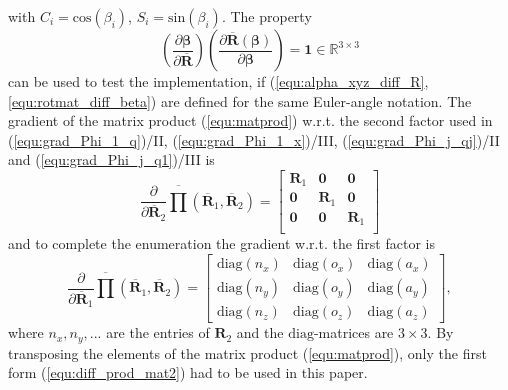 \documentclass[robotics,article,submit,moreauthors,pdftex]{Definitions/mdpi}
\newcommand{\bm}[1]{\boldsymbol{#1}}
\begin{document}
%
with $C_i=\mathrm{cos}(\beta_i)$, $S_i=\mathrm{sin}(\beta_i)$.
The property
%
\begin{equation}
\left(\frac{\partial \bm{\beta}}{\partial \overline{\bm{R}}}\right)
\left(\frac{\partial \overline{\bm{R}}(\bm{\beta})}{\partial \bm{\beta}}\right)
=
\bm{1} \in {\mathbb{R}}^{3 \times 3}
\end{equation}
%
can be used to test the implementation, if (\ref{equ:alpha_xyz_diff_R}, \ref{equ:rotmat_diff_beta}) are defined for the same Euler-angle notation.
The gradient of the matrix product (\ref{equ:matprod}) w.r.t. the second factor used in (\ref{equ:grad_Phi_1_q})/II, (\ref{equ:grad_Phi_1_x})/III, (\ref{equ:grad_Phi_j_qj})/II and (\ref{equ:grad_Phi_j_q1})/III is
%
\begin{equation}
\frac{\partial }{\partial \overline{\bm{R}}_2}
\overline{\prod}\left( \overline{\bm{R}}_1, \overline{\bm{R}}_2\right)
=
\begin{bmatrix}
\bm{R}_1 & \bm{0} & \bm{0} \\
\bm{0} & \bm{R}_1 & \bm{0} \\
\bm{0} & \bm{0} & \bm{R}_1  \\
\end{bmatrix}
\label{equ:diff_prod_mat2}
\end{equation}
%
and to complete the enumeration the gradient w.r.t. the first factor is
%
\begin{equation}
\frac{\partial }{\partial \overline{\bm{R}}_1}
\overline{\prod}\left( \overline{\bm{R}}_1, \overline{\bm{R}}_2\right)
=
\begin{bmatrix}
{\mathrm{diag}}(n_x)&{\mathrm{diag}}(o_x)&{\mathrm{diag}}(a_x) \\ {\mathrm{diag}}(n_y)&{\mathrm{diag}}(o_y)&{\mathrm{diag}}(a_y)\\ {\mathrm{diag}}(n_z)&{\mathrm{diag}}(o_z)&{\mathrm{diag}}(a_z)
\end{bmatrix},
\label{equ:diff_prod_mat1}
\end{equation}
%
where $n_x,n_y,...$ are the entries of $\bm{R}_2$ and the $\mathrm{diag}$-matrices are $3 \times 3$.
By transposing the elements of the matrix product (\ref{equ:matprod}), only the first form (\ref{equ:diff_prod_mat2}) had to be used in this paper.


\end{document}
